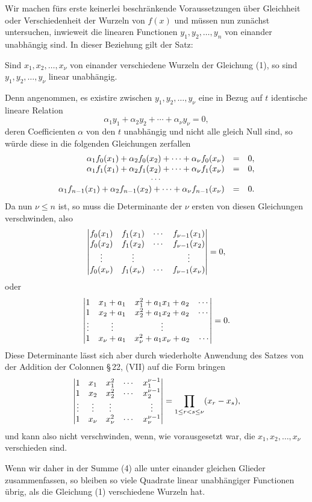 \documentclass[11pt]{article}
\begin{document}
Wir machen f\"urs erste keinerlei beschr\"ankende Voraussetzungen \"uber Gleichheit oder Verschiedenheit der Wurzeln von $f(x)$ und m\"ussen nun zun\"achst untersuchen, inwieweit die linearen Functionen $y_1,y_2,\ldots,y_n$ von einander unabh\"angig sind. In dieser Beziehung gilt der Satz:

Sind $x_1,x_2,\ldots,x_\nu$ von einander verschiedene Wurzeln der Gleichung (1), so sind $y_1,y_2,\ldots,y_\nu$ linear unabh\"angig.

Denn angenommen, es existire zwischen $y_1,y_2,\ldots,y_\nu$ eine in Bezug auf $t$ identische lineare Relation
\[
        \alpha_1y_1+\alpha_2y_2+\cdots+\alpha_\nu y_\nu=0,
\]
deren Coefficienten $\alpha$ von den $t$ unabh\"angig und nicht alle gleich Null sind, so w\"urde diese in die folgenden Gleichungen zerfallen
\[
\begin{array}{rcl}
\alpha_1f_0(x_1)+\alpha_2f_0(x_2)+\cdots+\alpha_\nu f_0(x_\nu)&=&0,\cr
\alpha_1f_1(x_1)+\alpha_2f_1(x_2)+\cdots+\alpha_\nu f_1(x_\nu)&=&0,\cr
\multicolumn{3}{c}{\cdots}\cr
\alpha_1f_{n-1}(x_1)+\alpha_2f_{n-1}(x_2)+\cdots+\alpha_\nu f_{n-1}(x_\nu)&=&0.
\end{array}
\]
Da nun $\nu\leq n$ ist, so muss die Determinante der $\nu$ ersten von diesen Gleichungen verschwinden, also
\[
\begin{vmatrix}
 f_0(x_1)&f_1(x_1)&\cdots&f_{\nu-1}(x_1)\cr
 f_0(x_2)&f_1(x_2)&\cdots&f_{\nu-1}(x_2)\cr
 \vdots&\vdots&&\vdots\cr
 f_0(x_\nu)&f_1(x_\nu)&\cdots&f_{\nu-1}(x_\nu)
\end{vmatrix}=0,
\]
oder
\[
\begin{vmatrix}
 1&x_1+a_1&x_1^2+a_1x_1+a_2&\cdots\cr
 1&x_2+a_1&x_2^2+a_1x_2+a_2&\cdots\cr
 \vdots&\vdots&\vdots&\cr
 1&x_\nu+a_1&x_\nu^2+a_1x_\nu+a_2&\cdots
\end{vmatrix}=0.
\]
Diese Determinante l\"asst sich aber durch wiederholte Anwendung des Satzes von der Addition der Colonnen \S\,22, (VII) auf die Form bringen
\[
\begin{vmatrix}
1&x_1&x_1^2&\cdots&x_1^{\nu-1}\cr
1&x_2&x_2^2&\cdots&x_2^{\nu-1}\cr
\vdots&\vdots&\vdots&&\vdots\cr
1&x_\nu&x_\nu^2&\cdots&x_\nu^{\nu-1}
\end{vmatrix}
=\prod_{1\leq r<s\leq \nu}(x_r-x_s),
\]
und kann also nicht verschwinden, wenn, wie vorausgesetzt war, die $x_1,x_2,\ldots,x_\nu$ verschieden sind.

Wenn wir daher in der Summe (4) alle unter einander gleichen Glieder zusammenfassen, so bleiben so viele Quadrate linear unabh\"angiger Functionen \"ubrig, als die Gleichung (1) verschiedene Wurzeln hat.
\end{document}
